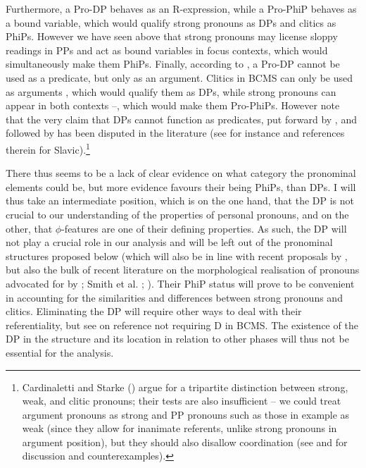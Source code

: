 \documentclass[output=paper,colorlinks,citecolor=brown]{langscibook}
\begin{document}
Furthermore, a Pro-DP behaves as an R-expression, while a Pro-PhiP behaves as a bound variable, which would qualify strong pronouns as DPs and clitics as PhiPs. However we have seen above that strong pronouns may license sloppy readings in PPs and act as bound variables in focus contexts, which would simultaneously make them PhiPs. Finally, according to \citet{dechainewiltschko}, a Pro-DP cannot be used as a predicate, but only as an argument. Clitics in BCMS can only be used as arguments , which would qualify them as DPs, while strong pronouns can appear in both contexts --, which would make them Pro-PhiPs. However note that the very claim that DPs cannot function as predicates, put forward by \citet{longobardi94}, and followed by \citet{dechainewiltschko} has been disputed in the literature (see for instance \citealt[21f.]{pereltsvaig07} and references therein for Slavic).\footnote{Cardinaletti and Starke (\citeyear{cardinalettistarke}) argue for a tripartite distinction between strong, weak, and clitic pronouns; their tests are also insufficient -- we could treat argument pronouns as strong and PP pronouns such as those in example  as weak (since they allow for inanimate referents, unlike strong pronouns in argument position), but they should also disallow coordination (see \citealt{beslinNPDP} and \citealt{despic11} for discussion and counterexamples).}

\label{cliticargument} 
\z

\label{pronounpredicate}
\z

\noindent There thus seems to be a lack of clear evidence on what category the pronominal elements could be, but more evidence favours their being PhiPs, than DPs. I will thus take an intermediate position, which is on the one hand, that the DP is not crucial to our understanding of the properties of personal pronouns, and on the other, that $\phi$-features are one of their defining properties. As such, the DP will not play a crucial role in our analysis and will be left out of the pronominal structures proposed below (which will also be in line with recent proposals by \citealt{stegovec19,ruda21pronounstructure}, but also the bulk of recent literature on the morphological realisation of pronouns advocated for by \citealt{moskal15}; Smith et al. \citeyear{smithetal18}; \citealt{mcfadden18}). Their PhiP status will prove to be convenient in accounting for the similarities and differences between strong pronouns and clitics. Eliminating the DP will require other ways to deal with their referentiality, but see \citet{trenkic04,branko14,branko-diss} on reference not requiring D in BCMS. The existence of the DP in the structure and its location in relation to other phases will thus not be essential for the analysis. 
\end{document}

